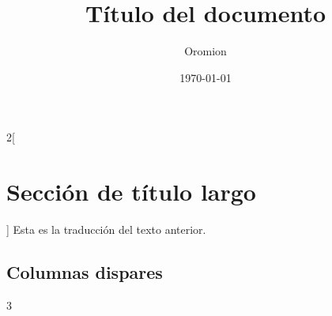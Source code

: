 \documentclass{article}
\title{Título del documento}
\author{Oromion}
\date{\today}
\begin{document}
\maketitle

\begin{abstract}
	\lipsum[2]
\end{abstract}
\begin{paracol}{2}[\section{Sección de título largo}]
	\lipsum[2]
	\switchcolumn
	Esta es la traducción del texto anterior.
	\switchcolumn*
	\lipsum[3]
	\switchcolumn
	\lipsum[2]
\end{paracol}
\subsection{Columnas dispares}
\begin{paracol}{3}
	\lipsum[5]%
	\switchcolumn
	\lipsum[6]%
	\switchcolumn
	\lipsum[7]
\end{paracol}



\end{document}

